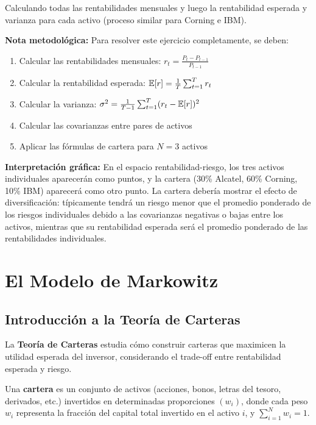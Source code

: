\begin{ejemplo}
Calculando todas las rentabilidades mensuales y luego la rentabilidad esperada y varianza para cada activo (proceso similar para Corning e IBM).

\textbf{Nota metodológica:} Para resolver este ejercicio completamente, se deben:
\begin{enumerate}
\item Calcular las rentabilidades mensuales: $r_t = \frac{P_t - P_{t-1}}{P_{t-1}}$
\item Calcular la rentabilidad esperada: $\mathbb{E}[r] = \frac{1}{T} \sum_{t=1}^{T} r_t$
\item Calcular la varianza: $\sigma^2 = \frac{1}{T-1} \sum_{t=1}^{T} (r_t - \mathbb{E}[r])^2$
\item Calcular las covarianzas entre pares de activos
\item Aplicar las fórmulas de cartera para $N=3$ activos
\end{enumerate}

\textbf{Interpretación gráfica:} En el espacio rentabilidad-riesgo, los tres activos individuales aparecerán como puntos, y la cartera (30\% Alcatel, 60\% Corning, 10\% IBM) aparecerá como otro punto. La cartera debería mostrar el efecto de diversificación: típicamente tendrá un riesgo menor que el promedio ponderado de los riesgos individuales debido a las covarianzas negativas o bajas entre los activos, mientras que su rentabilidad esperada será el promedio ponderado de las rentabilidades individuales.
\end{ejemplo}

\section{El Modelo de Markowitz}

\subsection{Introducción a la Teoría de Carteras}

\begin{definicion}
La \textbf{Teoría de Carteras} estudia cómo construir carteras que maximicen la utilidad esperada del inversor, considerando el trade-off entre rentabilidad esperada y riesgo.
\end{definicion}

\begin{definicion}[Cartera]
Una \textbf{cartera} es un conjunto de activos (acciones, bonos, letras del tesoro, derivados, etc.) invertidos en determinadas proporciones $(w_i)$, donde cada peso $w_i$ representa la fracción del capital total invertido en el activo $i$, y $\sum_{i=1}^N w_i = 1$.
\end{definicion}


